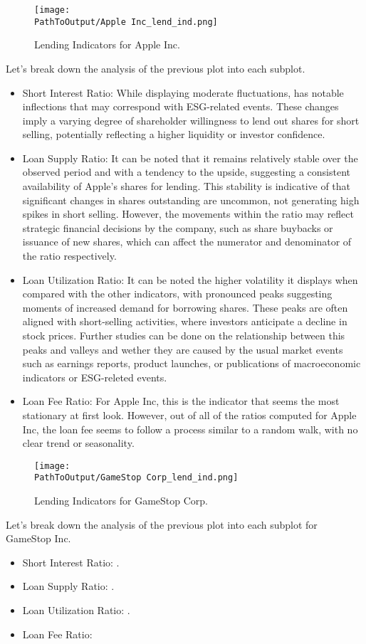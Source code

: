 \begin{figure}[H]
\centering
\caption{Lending Indicators for Apple Inc.}
  \centering
  \texttt{[image: \\PathToOutput/Apple Inc\_lend\_ind.png]}
\label{fig:apple_lending_indicators}
\end{figure}

Let's break down the analysis of the previous plot into each subplot.

\begin{itemize}
	\item Short Interest Ratio: While displaying moderate fluctuations, has notable inflections that may correspond with ESG-related events. These changes imply a varying degree of shareholder willingness to lend out shares for short selling, potentially reflecting a higher liquidity or investor confidence.
	\item Loan Supply Ratio: It can be noted that it remains relatively stable over the observed period and with a tendency to the upside, suggesting a consistent availability of Apple's shares for lending. This stability is indicative of that significant changes in shares outstanding are uncommon, not generating high spikes in short selling. However, the movements within the ratio may reflect strategic financial decisions by the company, such as share buybacks or issuance of new shares, which can affect the numerator and denominator of the ratio respectively.
	\item Loan Utilization Ratio: It can be noted the higher volatility it displays when compared with the other indicators, with pronounced peaks suggesting moments of increased demand for borrowing shares. These peaks are often aligned with short-selling activities, where investors anticipate a decline in stock prices. Further studies can be done on the relationship between this peaks and valleys and wether they are caused by the usual market events such as earnings reports, product launches, or publications of macroeconomic indicators or ESG-releted events.
	\item Loan Fee Ratio: For Apple Inc, this is the indicator that seems the most stationary at first look. However, out of all of the ratios computed for Apple Inc, the loan fee seems to follow a process similar to a random walk, with no clear trend or seasonality.
\end{itemize}


\begin{figure}[H]
	\centering
	\caption{Lending Indicators for GameStop Corp.}
	  \centering
	  \texttt{[image: \\PathToOutput/GameStop Corp\_lend\_ind.png]}
	\label{fig:gamestop_lending_indicators}
\end{figure}


Let's break down the analysis of the previous plot into each subplot for GameStop Inc.

\begin{itemize}
	\item Short Interest Ratio: .
	\item Loan Supply Ratio: .
	\item Loan Utilization Ratio: .
	\item Loan Fee Ratio: 
\end{itemize}


